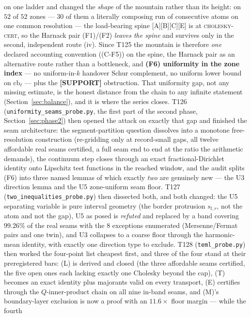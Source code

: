 \documentclass[11pt,a4paper]{article}
\begin{document}
on one ladder and changed the \emph{shape} of the mountain rather than its height: on $52$ of $52$
zones --- $30$ of them a literally composing run of consecutive atoms on one common resolution ---
the load-bearing spine [A][B][C][E] is at \textsc{cholesky-cert}, so the Harnack pair (F1)/(F2)
\emph{leaves the spine} and survives only in the second, independent route (iv). Since T125 the
mountain is therefore \emph{one} declared accounting convention ((C-F5)) on the spine, the Harnack
pair as an alternative route rather than a bottleneck, and \textbf{(F6) uniformity in the zone
index} --- no uniform-in-$k$ handover Schur complement, no uniform lower bound on
$\mathrm{cb}_\ell$ --- plus the \textbf{[SUPPORT]} obstruction. That uniformity gap, not any missing
estimate, is the honest distance from the chain to any infinite statement
(Section~\ref{sec:balance}), and it is where the series closes. T126
(\texttt{uniformity\_seams\_probe.py}, the first part of the second phase,
Section~\ref{sec:phase2}) then opened the attack on exactly that gap and finished the seam
architecture: the segment-partition question dissolves into a monotone free-resolution construction
(re-gridding only at record-small gaps, all twelve affordable real seams certified, a full seam end
to end at the ratio the arithmetic demands), the continuum step closes through an exact
fractional-Dirichlet identity onto Lipschitz test functions in the reached window, and the audit
splits (F6) into three named lemmas of which exactly \emph{two} are genuinely new --- the U3
direction lemma and the U5 zone-uniform seam floor. T127 (\texttt{two\_inequalities\_probe.py})
then dissected both, and both changed: the U5 separating variable is pure interval geometry (the
border protrusion $s_{l,r}$, not the atom and not the gap), U5 as posed is \emph{refuted} and
replaced by a band covering $99.26\%$ of the real seams with the $8$ exceptions enumerated
(Mersenne/Fermat pairs and one twin), and U3 collapses to a coarse floor through the harmonic-mean
identity, with exactly one direction type to exclude. T128 (\texttt{teml\_probe.py}) then worked
the four-point list cheapest first, and three of the four stand at their preregistered bars: (L)
is derived and closed (the three affordable seams certified, the five open ones each lacking
exactly one Cholesky beyond the cap), (T) becomes an exact identity plus majorants valid on every
transport, (E) certifies through the $Q$-inner-product chain on all nine in-band seams, and (M)'s
boundary-layer exclusion is now a proof with an $11.6\times$ floor margin --- while the fourth
\end{document}
